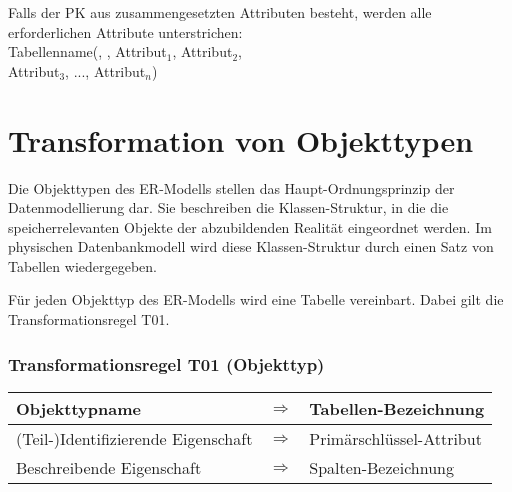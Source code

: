         Falls der PK aus zusammengesetzten Attributen besteht, werden alle erforderlichen Attribute unterstrichen:\\
        \hspace*{12mm}Tabellenname(, , Attribut$_1$, Attribut$_2$,\\
        \hspace*{40mm}Attribut$_3$, ..., Attribut$_n$)
    \section{Transformation von Objekttypen}
      Die Objekttypen des ER-Modells stellen das Haupt-Ordnungsprinzip der Datenmodellierung dar. Sie beschreiben die Klassen-Struktur, in die die speicherrelevanten Objekte der abzubildenden Realität eingeordnet werden. Im physischen Datenbankmodell wird diese Klassen-Struktur durch einen Satz von Tabellen wiedergegeben.

      Für jeden Objekttyp des ER-Modells wird eine Tabelle vereinbart. Dabei gilt die Transformationsregel T01.
      \subsubsection{Transformationsregel T01 (Objekttyp)}
      \begin{supertabular}[h]{|l|l|p{7.5cm}|}
        \hline
        \footnotesize Objekttypname & $\Rightarrow$ & \footnotesize Tabellen-Bezeichnung\\
        \hline
        \footnotesize (Teil-)Identifizierende Eigenschaft & $\Rightarrow$ & \footnotesize Primärschlüssel-Attribut\\
        \hline
        \footnotesize Beschreibende Eigenschaft & $\Rightarrow$ & \footnotesize Spalten-Bezeichnung\\
        \hline
      \end{supertabular}

      \begin{center}
      \end{center}
